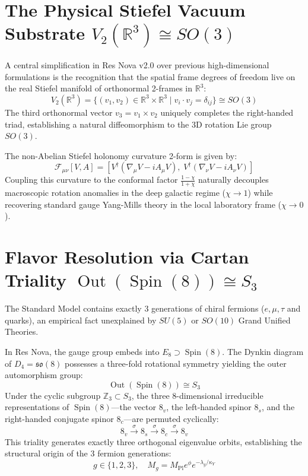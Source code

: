 \documentclass[11pt,a4paper]{article}
\begin{document}
\section{The Physical Stiefel Vacuum Substrate $V_2(\mathbb{R}^3) \cong SO(3)$}

A central simplification in Res Nova v2.0 over previous high-dimensional formulations is the recognition that the spatial frame degrees of freedom live on the real Stiefel manifold of orthonormal 2-frames in $\mathbb{R}^3$:
\begin{equation}
V_2(\mathbb{R}^3) = \{ (v_1, v_2) \in \mathbb{R}^3 \times \mathbb{R}^3 \mid v_i \cdot v_j = \delta_{ij} \} \cong SO(3)
\end{equation}
The third orthonormal vector $v_3 = v_1 \times v_2$ uniquely completes the right-handed triad, establishing a natural diffeomorphism to the 3D rotation Lie group $SO(3)$.

The non-Abelian Stiefel holonomy curvature 2-form is given by:
\begin{equation}
\mathcal{F}_{\mu\nu}[V,A] = [V^\dagger (\nabla_\mu V - i A_\mu V), \; V^\dagger (\nabla_\nu V - i A_\nu V)]
\end{equation}
Coupling this curvature to the conformal factor $\frac{1-\chi}{1+\chi}$ naturally decouples macroscopic rotation anomalies in the deep galactic regime ($\chi \to 1$) while recovering standard gauge Yang-Mills theory in the local laboratory frame ($\chi \to 0$).

\section{Flavor Resolution via Cartan Triality $\operatorname{Out}(\operatorname{Spin}(8)) \cong S_3$}

The Standard Model contains exactly 3 generations of chiral fermions ($e, \mu, \tau$ and quarks), an empirical fact unexplained by $SU(5)$ or $SO(10)$ Grand Unified Theories. 

In Res Nova, the gauge group embeds into $E_8 \supset \operatorname{Spin}(8)$. The Dynkin diagram of $D_4 = \mathfrak{so}(8)$ possesses a three-fold rotational symmetry yielding the outer automorphism group:
\begin{equation}
\operatorname{Out}(\operatorname{Spin}(8)) \cong S_3
\end{equation}
Under the cyclic subgroup $\mathbb{Z}_3 \subset S_3$, the three 8-dimensional irreducible representations of $\operatorname{Spin}(8)$---the vector $8_v$, the left-handed spinor $8_s$, and the right-handed conjugate spinor $8_c$---are permuted cyclically:
\begin{equation}
8_v \xrightarrow{\;\sigma\;} 8_s \xrightarrow{\;\sigma\;} 8_c \xrightarrow{\;\sigma\;} 8_v
\end{equation}
This triality generates exactly three orthogonal eigenvalue orbits, establishing the structural origin of the 3 fermion generations:
\begin{equation}
g \in \{1, 2, 3\}, \quad M_g = M_{\mathrm{Pl}} e^\phi e^{-\lambda_g / \kappa_Y}
\end{equation}
\end{document}
